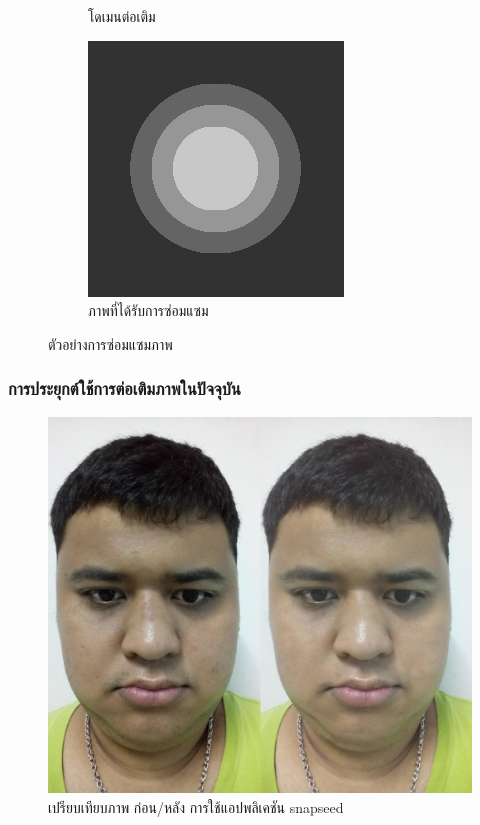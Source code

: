 \documentclass[xcolor=dvipsnames, xetex,serif]{beamer}
\numberwithin{equation}{section}
\begin{document}
\begin{frame}
\begin{figure}[H]
\begin{subfigure}{0.3\linewidth}
					\caption{โดเมนต่อเติม}
				\end{subfigure}
				\begin{subfigure}{0.3\linewidth}
					\centering
					\includegraphics[width=0.8\linewidth]{images/grayscale_inpaint/result_splitbergman.png}
					\caption{ภาพที่ได้รับการซ่อมแซม}
				\end{subfigure}
				\caption{ตัวอย่างการซ่อมแซมภาพ}
				\label{fig1}
			\end{figure}
		\end{frame} 		
		\begin{frame}
			\frametitle{การประยุกต์ใช้การต่อเติมภาพในปัจจุบัน}
			\begin{figure}[H]
				\centering
				\includegraphics[width=0.6\linewidth]{images/self-beauty.jpg}
				\caption{เปรียบเทียบภาพ ก่อน/หลัง การใช้แอปพลิเคชัน snapseed}
				\label{image:self-beauty}
			\end{figure}
		\end{frame} 		
\end{document}
